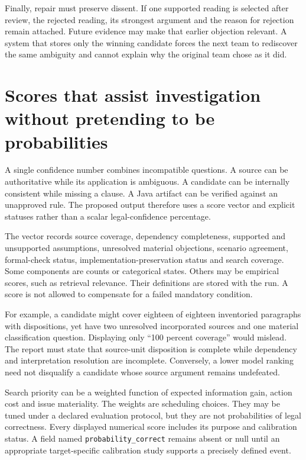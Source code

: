 Finally, repair must preserve dissent. If one supported reading is selected after
review, the rejected reading, its strongest argument and the reason for rejection
remain attached. Future evidence may make that earlier objection relevant. A
system that stores only the winning candidate forces the next team to rediscover
the same ambiguity and cannot explain why the original team chose as it did.

\section{Scores that assist investigation without pretending to be probabilities}
\label{merge:M06:19}


A single confidence number combines incompatible questions. A source can be
authoritative while its application is ambiguous. A candidate can be internally
consistent while missing a clause. A Java artifact can be verified against an
unapproved rule. The proposed output therefore uses a score vector and explicit
statuses rather than a scalar legal-confidence percentage.

The vector records source coverage, dependency completeness, supported and
unsupported assumptions, unresolved material objections, scenario agreement,
formal-check status, implementation-preservation status and search coverage.
Some components are counts or categorical states. Others may be empirical
scores, such as retrieval relevance. Their definitions are stored with the run.
A score is not allowed to compensate for a failed mandatory condition.

For example, a candidate might cover eighteen of eighteen inventoried paragraphs
with dispositions, yet have two unresolved incorporated sources and one material
classification question. Displaying only ``100 percent coverage'' would mislead.
The report must state that source-unit disposition is complete while dependency
and interpretation resolution are incomplete. Conversely, a lower model ranking
need not disqualify a candidate whose source argument remains undefeated.


Search priority can be a weighted function of expected information gain, action
cost and issue materiality. The weights are scheduling choices. They may be tuned
under a declared evaluation protocol, but they are not probabilities of legal
correctness. Every displayed numerical score includes its purpose and calibration
status. A field named \texttt{probability\_correct} remains absent or null until an
appropriate target-specific calibration study supports a precisely defined event.

